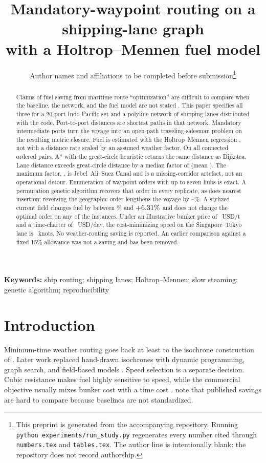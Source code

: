 \documentclass[11pt]{article}
\title{Mandatory-waypoint routing on a shipping-lane graph\\
with a Holtrop--Mennen fuel model}
\author{%
Author names and affiliations to be completed before submission\thanks{%
This preprint is generated from the accompanying repository.
Running \texttt{python experiments/run\_study.py} regenerates every
number cited through \texttt{numbers.tex} and \texttt{tables.tex}.
The author line is intentionally blank: the repository does not record authorship.}
}
\date{}
\begin{document}
\maketitle

\begin{abstract}
Claims of fuel saving from maritime route ``optimization'' are difficult to compare when the baseline, the network, and the fuel model are not stated \citep{zis2020}.
This paper specifies all three for a 20-port Indo-Pacific set and a polyline network of shipping lanes distributed with the code.
Port-to-port distances are shortest paths in that network.
Mandatory intermediate ports turn the voyage into an open-path traveling-salesman problem on the resulting metric closure.
Fuel is estimated with the Holtrop--Mennen regression \citep{holtrop1982,holtrop1984}, not with a distance rate scaled by an assumed weather factor.
On all \NConnected{} connected ordered pairs, A* with the great-circle heuristic returns the same distance as Dijkstra.
Lane distance exceeds great-circle distance by a median factor of \MedianDetour{} (mean \MeanDetour{}).
The maximum factor, \MaxDetour{}, is Jebel~Ali--Suez Canal and is a missing-corridor artefact, not an operational detour.
Enumeration of waypoint orders with up to seven hubs is exact.
A permutation genetic algorithm recovers that order in every replicate, as does nearest insertion; reversing the geographic order lengthens the voyage by \ReversedGapMin--\ReversedGapMax\%.
A stylized current field changes fuel by between \CurrentPenalty\% and \(+6.31\%\) and does not change the optimal order on any of the \NInstances{} instances.
Under an illustrative bunker price of \BunkerPrice~USD/t and a time-charter of \CharterRate~USD/day, the cost-minimizing speed on the Singapore--Tokyo lane is \EconomicSpeed~knots.
No weather-routing saving is reported.
An earlier comparison against a fixed 15\% allowance was not a saving and has been removed.
\end{abstract}

\noindent\textbf{Keywords:}
ship routing; shipping lanes; Holtrop--Mennen; slow steaming; genetic algorithm; reproducibility

\section{Introduction}
\label{sec:intro}

Minimum-time weather routing goes back at least to the isochrone construction of \citet{james1957}.
Later work replaced hand-drawn isochrones with dynamic programming, graph search, and field-based models \citep{mannarini2016,zis2020}.
Speed selection is a separate decision.
Cubic resistance makes fuel highly sensitive to speed, while the commercial objective usually mixes bunker cost with a time cost \citep{corbett2009,notteboom2009,psaraftis2013}.
\citet{zis2020} note that published savings are hard to compare because baselines are not standardized.
\end{document}
